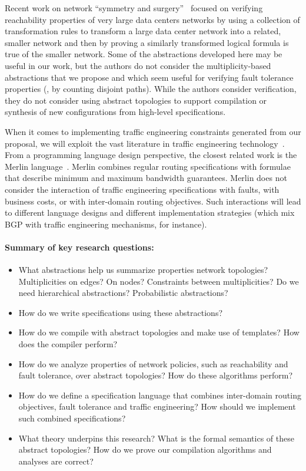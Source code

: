Recent work on network ``symmetry and surgery''~\cite{bjorner+:scaling-network-verification} focused on verifying reachability properties of very large
data centers networks by using a collection of transformation rules to 
transform a large data center network into
a related, smaller network and then by proving a similarly transformed
logical formula is true of the smaller network.  Some of the abstractions
developed here may be useful in our work, but the authors do not consider
the multiplicity-based abstractions that we propose and which seem useful
for verifying fault tolerance properties (\eg, by counting disjoint paths).
While the authors consider verification, they do not consider using
abstract topologies to support compilation or synthesis
of new configurations from high-level specifications.

When it comes to implementing traffic engineering constraints generated from
our proposal, we will exploit
the vast literature in traffic engineering technology~\cite{?,?}.  From a programming language
design perspective, the closest related work is the Merlin language~\cite{merlin}.  Merlin
combines regular routing specifications with formulae that describe minimum and maximum
bandwidth guarantees.  Merlin does not consider the interaction of traffic engineering
specifications with faults, with business costs, or with inter-domain routing objectives.  
Such interactions will lead to different language designs and different implementation
strategies (which mix BGP with traffic engineering mechanisms, for instance).

\paragraph*{Summary of key research questions:}

\begin{itemize}
\item What abstractions help us summarize properties network topologies?
Multiplicities on edges?  On nodes?  Constraints between multiplicities?
Do we need hierarchical abstractions?  Probabilistic abstractions? 
\item How do we write \Propane specifications using these abstractions?
\item How do we compile with abstract topologies and make use of templates?  
 How does the compiler perform?
\item How do we analyze properties of network policies, such as
reachability and fault tolerance, over abstract
topologies?  How do these algorithms perform?
\item How do we define a specification language that combines inter-domain
routing objectives, fault tolerance and traffic engineering?  How
should we implement such combined specifications?
\item What theory underpins this research?  What is the formal 
semantics of these abstract topologies?  How do we prove our
compilation algorithms and analyses are correct?
\end{itemize}

